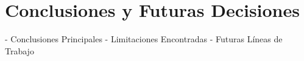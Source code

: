 \chapter{Conclusiones y Futuras Decisiones}

- Conclusiones Principales
- Limitaciones Encontradas
- Futuras Líneas de Trabajo